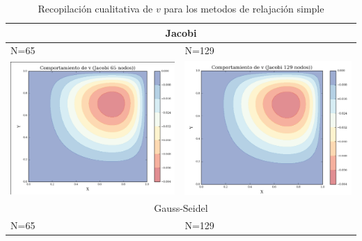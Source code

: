 \documentclass[letter,10pt]{article}
\begin{document}
\begin{table}[H]
\centering
\caption{Recopilación cualitativa de $v$ para los metodos de relajación simple}
\begin{tabular}{|l|l|}
\hline
\multicolumn{2}{|c|}{Jacobi} \\ \hline
N=65 & N=129 \\ 
\includegraphics[scale=0.4]{img/v_jacobi65N} & \includegraphics[scale=0.4]{img/v_jacobi129N} \\ \hline
\multicolumn{2}{|c|}{Gauss-Seidel} \\ \hline
N=65 & N=129 \\ 

\end{tabular}
\end{table}
\end{document}
